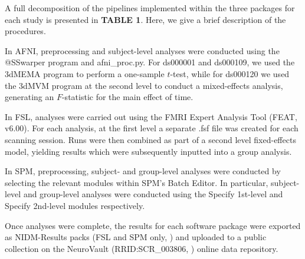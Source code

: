 A full decomposition of the pipelines implemented within the three packages for each study is presented in \textbf{TABLE 1}. Here, we give a brief description of the procedures. 

In AFNI, preprocessing and subject-level analyses were conducted using the @SSwarper program and afni\_proc.py. For ds000001 and ds000109, we used the 3dMEMA program to perform a one-sample $t$-test, while for ds000120 we used the 3dMVM program at the second level to conduct a mixed-effects analysis, generating an $F$-statistic for the main effect of time. 

In FSL, analyses were carried out using the FMRI Expert Analysis Tool (FEAT, v6.00). For each analysis, at the first level a separate .fsf file was created for each scanning session. Runs were then combined as part of a second level fixed-effects model, yielding results which were subsequently inputted into a group analysis. 

In SPM, preprocessing, subject- and group-level analyses were conducted by selecting the relevant modules within SPM's Batch Editor. In particular, subject-level and group-level analyses were conducted using the Specify 1st-level and Specify 2nd-level modules respectively. 

Once analyses were complete, the results for each software package were exported as NIDM-Results packs (FSL and SPM only, \citep{Maumet2016-se}) and uploaded to a public collection on the NeuroVault (RRID:SCR\_003806, \citep{Gorgolewski2015-vs}) online data repository. 

